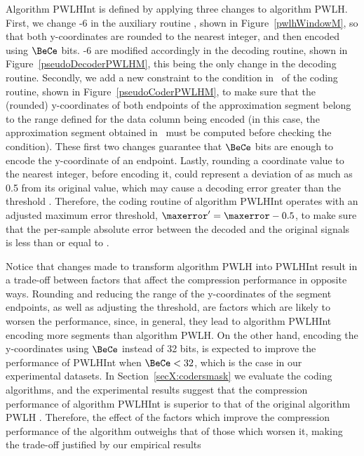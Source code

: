 Algorithm PWLHInt is defined by applying three changes to algorithm PWLH. First, we change -6 in the auxiliary routine \EncodeWindow, shown in Figure~\ref{pwlhWindowM}, so that both y-coordinates are rounded to the nearest integer, and then encoded using $\BeCe$ bits. -6 are modified accordingly in the decoding routine, shown in Figure~\ref{pseudoDecoderPWLHM}, this being the only change in the decoding routine. Secondly, we add a new constraint to the condition in \condLinePWLH\ of the coding routine, shown in Figure~\ref{pseudoCoderPWLHM}, to make sure that the (rounded) y-coordinates of both endpoints of the approximation segment belong to the range defined for the data column being encoded (in this case, the approximation segment obtained in \EncodeWindow\ must be computed before checking the condition). These first two changes guarantee that $\BeCe$ bits are enough to encode the y-coordinate of an endpoint. Lastly, rounding a coordinate value to the nearest integer, before encoding it, could represent a deviation of as much as 0.5 from its original value, which may cause a decoding error greater than the threshold \maxerror. Therefore, the coding routine of algorithm PWLHInt operates with an adjusted maximum error threshold, $\maxerror' = \maxerror - 0.5$, to make sure that the per-sample absolute error between the decoded and the original signals is less than or equal to \maxerror. 


\clearpage


Notice that changes made to transform algorithm PWLH into PWLHInt result in a trade-off between factors that affect the compression performance in opposite ways. Rounding and reducing the range of the y-coordinates of the segment endpoints, as well as adjusting the threshold, are factors which are likely to worsen the performance, since, in general, they lead to algorithm PWLHInt encoding more segments than algorithm PWLH. On the other hand, encoding the y-coordinates using $\BeCe$ instead of 32 bits, is expected to improve the performance of PWLHInt when $\BeCe < 32$, which is the case in our experimental datasets. In Section~\ref{secX:codersmask} we evaluate the coding algorithms, and the experimental results suggest that the compression performance of algorithm PWLHInt is superior to that of the original algorithm PWLH \cite{coder:pwlh}. Therefore, the effect of the factors which improve the compression performance of the algorithm outweighs that of those which worsen it, making the trade-off justified by our empirical results


